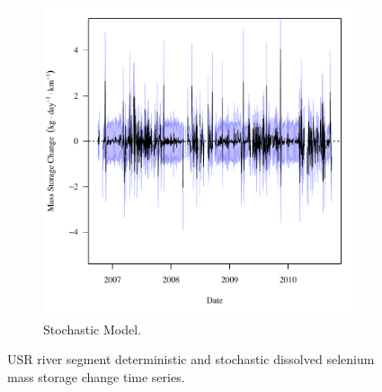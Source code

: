 \begin{linenumbers}
\begin{landscape}
\begin{figure}
\begin{subfigure}{0.7\textwidth}
			\includegraphics[width=\tableCustomSize]{"Figures/Results_USR/Stochastic/f Segment E"}
			\caption{Stochastic Model.}
		\end{subfigure}
		\caption{USR river segment deterministic and stochastic dissolved selenium mass storage change time series.}
	\end{figure}
\end{landscape}




\end{linenumbers}
